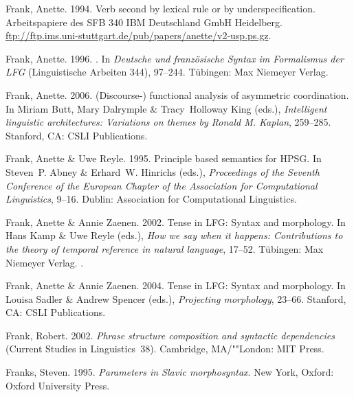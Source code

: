 \begin{thebibliography}{1420}
Frank, Anette. 1994.
\newblock Verb second by lexical rule or by underspecification.
\newblock Arbeitspapiere des SFB 340  IBM Deutschland GmbH Heidelberg.
\newblock
  \urlprefix\url{ftp://ftp.ims.uni-stuttgart.de/pub/papers/anette/v2-usp.ps.gz}.

Frank, Anette. 1996.
.
\newblock In \emph{{Deutsche und franz{\"o}sische Syntax im Formalismus der
  LFG}} (Linguistische Arbeiten 344), 97--244. T{\"u}bingen: Max Niemeyer
  Verlag.

Frank, Anette. 2006.
\newblock ({Discourse-}) functional analysis of asymmetric coordination.
\newblock In Miriam Butt, Mary Dalrymple \& Tracy~Holloway King (eds.),
  \emph{Intelligent linguistic architectures: {Variations} on themes by {Ronald
  M. Kaplan}}, 259--285. Stanford, CA: CSLI Publications.

Frank, Anette \& Uwe Reyle. 1995.
\newblock Principle based semantics for {HPSG}.
\newblock In Steven~P. Abney \& Erhard~W. Hinrichs (eds.), \emph{Proceedings of
  the {Seventh Conference of the European Chapter of the Association for
  Computational Linguistics}}, 9--16. Dublin: Association for Computational
  Linguistics.

Frank, Anette \& Annie Zaenen. 2002.
\newblock Tense in {LFG}: {Syntax} and morphology.
\newblock In Hans Kamp \& Uwe Reyle (eds.), \emph{How we say when it happens:
  {Contributions} to the theory of temporal reference in natural language},
  17--52. T{\"u}bingen: Max Niemeyer Verlag.
\newblock \reprintas {}.

Frank, Anette \& Annie Zaenen. 2004.
\newblock Tense in {LFG}: {Syntax} and morphology.
\newblock In Louisa Sadler \& Andrew Spencer (eds.), \emph{Projecting
  morphology}, 23--66. Stanford, CA: CSLI Publications.

Frank, Robert. 2002.
\newblock \emph{Phrase structure composition and syntactic dependencies}
  (Current Studies in Linguistics~38).
\newblock Cambridge, MA/""London: MIT Press.

Franks, Steven. 1995.
\newblock \emph{Parameters in {Slavic} morphosyntax}.
\newblock New York, Oxford: Oxford University Press.


\end{thebibliography}
